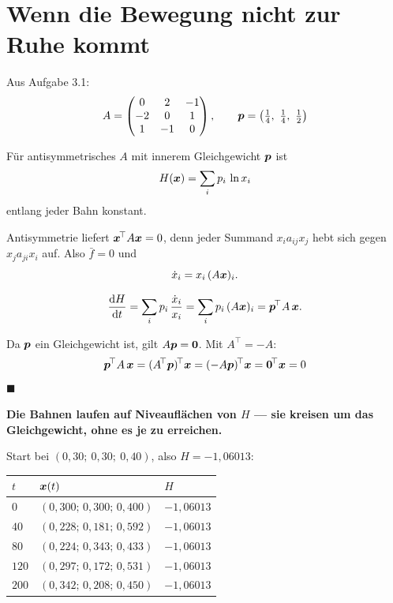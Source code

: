 \section{Wenn die Bewegung nicht zur Ruhe kommt}

\begin{merksatz}
Aus Aufgabe 3.1:
\[ A = \begin{pmatrix} 0 & 2 & -1\\ -2 & 0 & 1\\ 1 & -1 & 0 \end{pmatrix}, \qquad \vek p = \left(\tfrac14,\ \tfrac14,\ \tfrac12\right) \]

Für antisymmetrisches $A$ mit innerem Gleichgewicht $\boldsymbol{p}$ ist
\[ H(\boldsymbol{x}) = \sum_i p_i\,\ln x_i \]
entlang jeder Bahn konstant.

 Antisymmetrie liefert $\boldsymbol{x}^{\!\top} A\boldsymbol{x} = 0$, denn jeder Summand $x_i a_{ij} x_j$ hebt sich gegen $x_j a_{ji} x_i$ auf. Also $\bar f = 0$ und
\[ \dot x_i = x_i\,(A\boldsymbol{x})_i . \]

\[ \frac{\mathrm{d} H}{\mathrm{d} t} = \sum_i p_i\,\frac{\dot x_i}{x_i} = \sum_i p_i\,(A\boldsymbol{x})_i = \boldsymbol{p}^{\!\top} A\,\boldsymbol{x} . \]

 Da $\boldsymbol{p}$ ein Gleichgewicht ist, gilt $A\boldsymbol{p} = \boldsymbol{0}$. Mit $A^{\!\top} = -A$:
\[ \boldsymbol{p}^{\!\top} A\,\boldsymbol{x} = (A^{\!\top}\boldsymbol{p})^{\!\top}\boldsymbol{x} = (-A\boldsymbol{p})^{\!\top}\boldsymbol{x} = \boldsymbol{0}^{\!\top}\boldsymbol{x} = 0 \]
$\blacksquare$

\begin{center}
\begin{minipage}{0.9\textwidth}
\textbf{Die Bahnen laufen auf Niveauflächen von $H$ --- sie kreisen um das Gleichgewicht, ohne es je zu erreichen.}
\end{minipage}
\end{center}

Start bei $(0{,}30;\ 0{,}30;\ 0{,}40)$, also $H = -1{,}06013$:
\begin{center}
{\small
\renewcommand{\arraystretch}{1.48}
\begin{tabular}{@{}P{1.4cm}P{3.4cm}P{2.4cm}@{}}
\toprule
$t$ & $\boldsymbol{x}(t)$ & $H$\\
\midrule
$0$ & $(0{,}300;\,0{,}300;\,0{,}400)$ & $-1{,}06013$\\
$40$ & $(0{,}228;\,0{,}181;\,0{,}592)$ & $-1{,}06013$\\
$80$ & $(0{,}224;\,0{,}343;\,0{,}433)$ & $-1{,}06013$\\
$120$ & $(0{,}297;\,0{,}172;\,0{,}531)$ & $-1{,}06013$\\
$200$ & $(0{,}342;\,0{,}208;\,0{,}450)$ & $-1{,}06013$\\
\bottomrule
\end{tabular}}
\end{center}


\end{merksatz}
